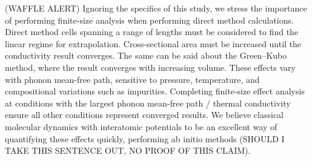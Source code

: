 (WAFFLE ALERT) Ignoring the specifics of this study, we stress the importance of performing finite-size analysis when performing direct method calculations.  Direct method cells spanning a range of lengths must be considered to find the linear regime for extrapolation. Cross-sectional area must be increased until the conductivity result converges. The same can be said about the Green--Kubo method, where the result converges with increasing volume. These effects vary with phonon mean-free path, sensitive to pressure, temperature, and compositional variations such as impurities. Completing finite-size effect analysis at conditions with the largest phonon mean-free path / thermal conductivity ensure all other conditions represent converged results. We believe classical molecular dynamics with interatomic potentials to be an excellent way of quantifying these effects quickly, performing ab initio methods (SHOULD I TAKE THIS SENTENCE OUT, NO PROOF OF THIS CLAIM).
